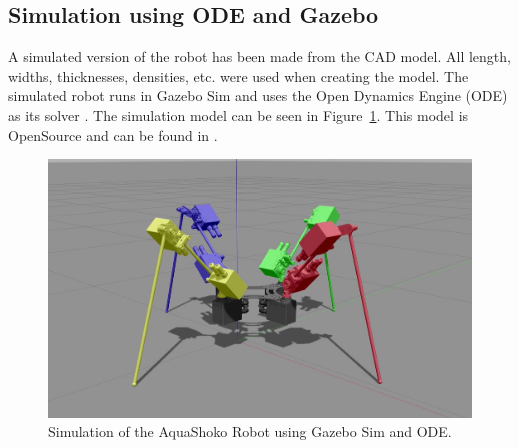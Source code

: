 \subsection{Simulation using ODE and Gazebo}
A simulated version of the robot has been made from the CAD model.
All length, widths, thicknesses, densities, etc. were used when creating the model.
The simulated robot runs in Gazebo Sim \cite{gazebo} and uses the Open Dynamics Engine (ODE) as its solver \cite{ode:2008}.
The simulation model can be seen in Figure~\ref{fig:gazebo}.
This model is OpenSource and can be found in \cite{AquashokoGazebo}.

\begin{figure}[!t]
\centering
\includegraphics[width=1.0\columnwidth]{./img/AquaShoko-Sim-c.jpg}
\caption{Simulation of the AquaShoko Robot using Gazebo Sim and ODE.}
\label{fig:gazebo}
\end{figure}





